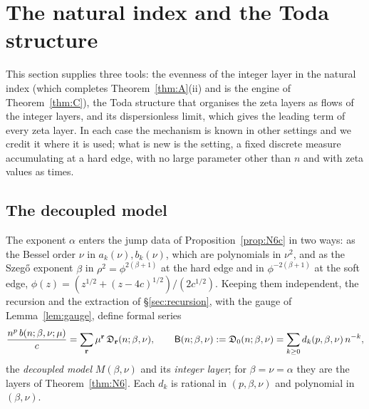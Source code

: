 \section{The natural index and the Toda structure}\label{sec:structure}

This section supplies three tools: the evenness of the integer layer in the natural index (which completes Theorem~\ref{thm:A}(ii)
and is the engine of Theorem~\ref{thm:C}), the Toda structure that organises the zeta layers as flows of the integer layers, and its
dispersionless limit, which gives the leading term of every zeta layer. In each case the mechanism is known in other settings and we
credit it where it is used; what is new is the setting, a fixed discrete measure accumulating at a hard edge, with no large parameter
other than $n$ and with zeta values as times.

\subsection{The decoupled model}\label{sec:decoupled}
The exponent $\alpha$ enters the jump data of Proposition~\ref{prop:N6c} in two ways: as the Bessel order $\nu$ in $a_k(\nu),b_k(\nu)$,
which are polynomials in $\nu^2$, and as the Szeg\H{o} exponent $\beta$ in $\rho^2=\phi^{2(\beta+1)}$ at the hard edge and in
$\phi^{-2(\beta+1)}$ at the soft edge, $\phi(z)=(z^{1/2}+(z-4c)^{1/2})/(2c^{1/2})$. Keeping them independent, the recursion and the extraction
of \S\ref{sec:recursion}, with the gauge of Lemma~\ref{lem:gauge}, define formal series
\begin{equation}\label{eq:decoupled}
  \frac{n^p\,b(n;\beta,\nu;\mu)}{c}=\sum_{\mathbf r}\mu^{\mathbf r}\,\mathfrak D_{\mathbf r}(n;\beta,\nu),\qquad
  \mathsf B(n;\beta,\nu):=\mathfrak D_0(n;\beta,\nu)=\sum_{k\ge0}d_k(p,\beta,\nu)\,n^{-k},
\end{equation}
the \emph{decoupled model} $M(\beta,\nu)$ and its \emph{integer layer}; for $\beta=\nu=\alpha$ they are the layers of Theorem~\ref{thm:N6}. Each
$d_k$ is rational in $(p,\beta,\nu)$ and polynomial in $(\beta,\nu)$.

